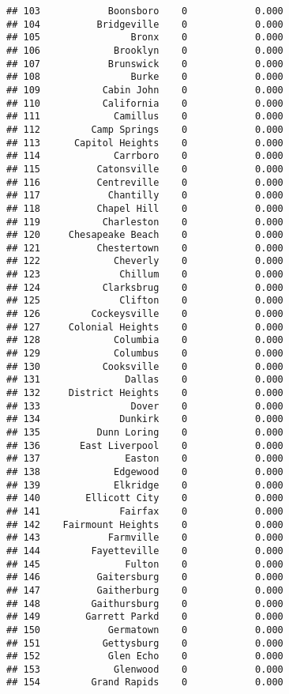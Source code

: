\documentclass[]{article}
\begin{document}
\begin{verbatim}
## 103            Boonsboro    0            0.000
## 104          Bridgeville    0            0.000
## 105                Bronx    0            0.000
## 106             Brooklyn    0            0.000
## 107            Brunswick    0            0.000
## 108                Burke    0            0.000
## 109           Cabin John    0            0.000
## 110           California    0            0.000
## 111             Camillus    0            0.000
## 112         Camp Springs    0            0.000
## 113      Capitol Heights    0            0.000
## 114             Carrboro    0            0.000
## 115          Catonsville    0            0.000
## 116          Centreville    0            0.000
## 117            Chantilly    0            0.000
## 118          Chapel Hill    0            0.000
## 119           Charleston    0            0.000
## 120     Chesapeake Beach    0            0.000
## 121          Chestertown    0            0.000
## 122             Cheverly    0            0.000
## 123              Chillum    0            0.000
## 124           Clarksbrug    0            0.000
## 125              Clifton    0            0.000
## 126         Cockeysville    0            0.000
## 127     Colonial Heights    0            0.000
## 128             Columbia    0            0.000
## 129             Columbus    0            0.000
## 130           Cooksville    0            0.000
## 131               Dallas    0            0.000
## 132     District Heights    0            0.000
## 133                Dover    0            0.000
## 134              Dunkirk    0            0.000
## 135          Dunn Loring    0            0.000
## 136       East Liverpool    0            0.000
## 137               Easton    0            0.000
## 138             Edgewood    0            0.000
## 139             Elkridge    0            0.000
## 140        Ellicott City    0            0.000
## 141              Fairfax    0            0.000
## 142    Fairmount Heights    0            0.000
## 143            Farmville    0            0.000
## 144         Fayetteville    0            0.000
## 145               Fulton    0            0.000
## 146          Gaitersburg    0            0.000
## 147          Gaitherburg    0            0.000
## 148         Gaithursburg    0            0.000
## 149        Garrett Parkd    0            0.000
## 150            Germatown    0            0.000
## 151           Gettysburg    0            0.000
## 152            Glen Echo    0            0.000
## 153             Glenwood    0            0.000
## 154         Grand Rapids    0            0.000

\end{verbatim}
\end{document}
